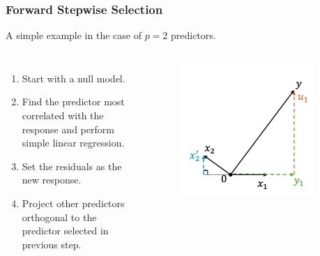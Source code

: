\begin{frame}
\frametitle{Forward Stepwise Selection}
A simple example in the case of $p=2$ predictors.

\begin{columns}[t]
    \begin{enumerate}
        \item Start with a null model.
        \item Find the predictor most correlated with the response and perform simple linear regression.
        \item Set the residuals as the new response.
        \item Project other predictors orthogonal to the predictor selected in previous step.
    \end{enumerate}
    
    \begin{figure}[!htbp]
        \begin{center}
            \includegraphics[width=0.9\textwidth]{img/FStepR/4.jpeg}
        \end{center}
    \end{figure}
    \end{columns}
\end{frame}

